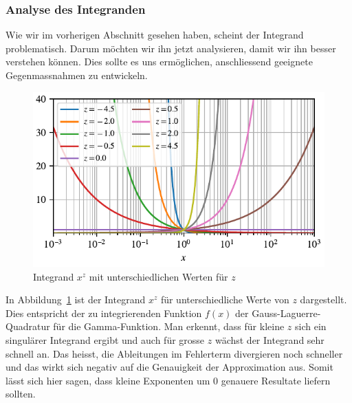 \subsubsection{Analyse des Integranden}
Wie wir im vorherigen Abschnitt gesehen haben,
scheint der Integrand problematisch.
Darum möchten wir ihn jetzt analysieren,
damit wir ihn besser verstehen können.
Dies sollte es uns ermöglichen,
anschliessend geeignete Gegenmassnahmen zu entwickeln.

\begin{figure}
\centering
% 
\includegraphics{papers/laguerre/images/integrand.pdf}
\caption{Integrand $x^z$ mit unterschiedlichen Werten für $z$}
\label{laguerre:fig:integrand}
\end{figure}

In Abbildung~\ref{laguerre:fig:integrand} ist der Integrand $x^z$ für
unterschiedliche Werte von $z$ dargestellt.
Dies entspricht der zu integrierenden Funktion $f(x)$
der Gauss-Laguerre-Quadratur für die Gamma-Funktion.
Man erkennt,
dass für kleine $z$ sich ein singulärer Integrand ergibt
und auch für grosse $z$ wächst der Integrand sehr schnell an.
Das heisst,
die Ableitungen im Fehlerterm divergieren noch schneller
und das wirkt sich negativ auf die Genauigkeit der Approximation aus.
Somit lässt sich hier sagen,
dass kleine Exponenten um $0$ genauere Resultate liefern sollten.

